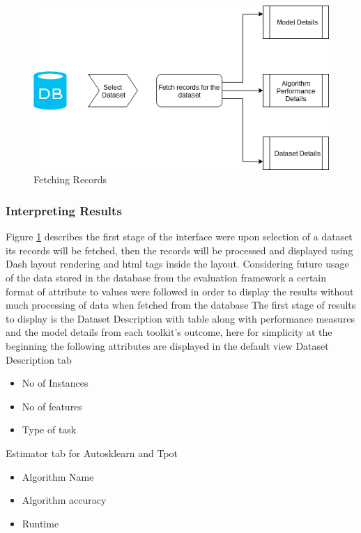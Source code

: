 \begin{figure}[!h]
    	\centering
    	\includegraphics[width=0.8\linewidth]{thesis_template/images/Database_fetch.png}
    	\caption{Fetching Records}
    	\label{fig:fetching_records}
        \end{figure}
        



\subsubsection{Interpreting Results }
Figure \ref{fig:fetching_records} describes the first stage of the interface were upon selection of a dataset its records will be fetched, then the records will be processed and displayed using Dash layout rendering and html tags inside the layout. Considering future usage of the data stored in the database from the evaluation framework a certain format of attribute to values were followed in order to display the results without much processing of data when fetched from the database
The first stage of results to display is the Dataset Description with table along with performance measures and the model details from each toolkit's outcome, here for simplicity at the beginning the following attributes are displayed in the default view
Dataset Description tab
\begin{itemize}
    \item No of Instances
    \item No of features
    \item Type of task
\end{itemize}

Estimator tab for Autosklearn and Tpot
\begin{itemize}
    \item Algorithm Name
    \item Algorithm accuracy
    \item Runtime
\end{itemize}

